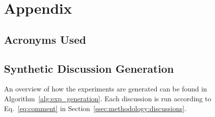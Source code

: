 \section{Appendix}
\label{sec:appendix}

\subsection{Acronyms Used}

\begin{acronym}[WWW] %
        {}
        {}
    
\end{acronym}


\subsection{Synthetic Discussion Generation}
\label{ssec:appendix:discussion}

An overview of how the experiments are generated can be found in Algorithm~\ref{alg:exp_generation}. Each discussion is run according to Eq.~\ref{eq:comment} in Section~\ref{ssec:methodology:discussions}.

